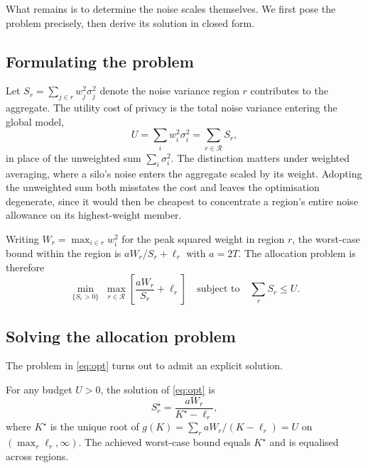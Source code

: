 \documentclass[acmsmall,screen,review,anonymous]{acmart}
\theoremstyle{acmdefinition}%
\newcommand{\Reg}{\mathcal{R}}
\begin{document}
What remains is to determine the noise scales themselves. We first pose the
problem precisely, then derive its solution in closed form.

\subsection{Formulating the problem}

Let $S_r = \sum_{j \in r} w_j^2 \sigma_j^2$ denote the noise variance region $r$
contributes to the aggregate. The utility cost of privacy is the total noise
variance entering the global model,
\begin{equation}
U = \sum_i w_i^2 \sigma_i^2 = \sum_{r \in \Reg} S_r ,
\label{eq:budget}
\end{equation}
in place of the unweighted sum $\sum_i \sigma_i^2$. The distinction matters under
weighted averaging, where a silo's noise enters the aggregate scaled by its
weight. Adopting the unweighted sum both misstates the cost and leaves the
optimisation degenerate, since it would then be cheapest to concentrate a region's
entire noise allowance on its highest-weight member.

Writing $W_r = \max_{i \in r} w_i^2$ for the peak squared weight in region $r$, the
worst-case bound within the region is $a W_r / S_r + \ell_r$ with $a = 2T$. The
allocation problem is therefore
\begin{equation}
\min_{\{S_r > 0\}} \; \max_{r \in \Reg} \left[ \frac{a W_r}{S_r} + \ell_r \right]
\quad \text{subject to} \quad \sum_{r} S_r \le U .
\label{eq:opt}
\end{equation}

\subsection{Solving the allocation problem}

The problem in \eqref{eq:opt} turns out to admit an explicit solution.

\begin{theorem}
\label{thm:allocation}
For any budget $U > 0$, the solution of \eqref{eq:opt} is
\begin{equation}
S_r^{\star} = \frac{a W_r}{K^{\star} - \ell_r},
\label{eq:alloc}
\end{equation}
where $K^{\star}$ is the unique root of $g(K) = \sum_r a W_r / (K - \ell_r) = U$
on $(\max_r \ell_r, \infty)$. The achieved worst-case bound equals $K^{\star}$ and
is equalised across regions.
\end{theorem}
\end{document}

